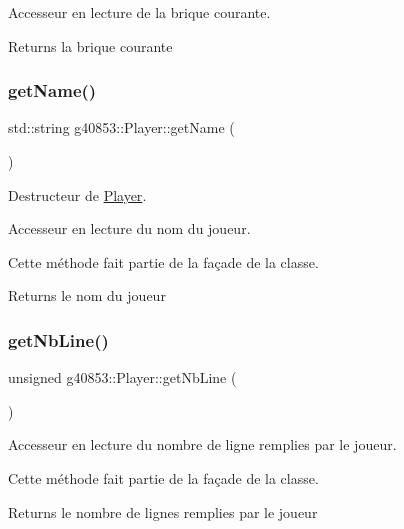 Accesseur en lecture de la brique courante. 

\begin{DoxyReturn}{Returns}
la brique courante 
\end{DoxyReturn}
\hypertarget{classg40853_1_1_player_a9dd73fb755774274ec182527c7401e84}{}\label{classg40853_1_1_player_a9dd73fb755774274ec182527c7401e84} 
\subsubsection{\texorpdfstring{get\+Name()}{getName()}}
{\footnotesize\ttfamily std\+::string g40853\+::\+Player\+::get\+Name (\begin{DoxyParamCaption}{ }\end{DoxyParamCaption})\hspace{0.3cm}{\ttfamily [inline]}}



Destructeur de \hyperlink{classg40853_1_1_player}{Player}. 

Accesseur en lecture du nom du joueur.

Cette méthode fait partie de la façade de la classe.

\begin{DoxyReturn}{Returns}
le nom du joueur 
\end{DoxyReturn}
\hypertarget{classg40853_1_1_player_a6dba0faa01aaa194c642de49e22b9f75}{}\label{classg40853_1_1_player_a6dba0faa01aaa194c642de49e22b9f75} 
\subsubsection{\texorpdfstring{get\+Nb\+Line()}{getNbLine()}}
{\footnotesize\ttfamily unsigned g40853\+::\+Player\+::get\+Nb\+Line (\begin{DoxyParamCaption}{ }\end{DoxyParamCaption})\hspace{0.3cm}{\ttfamily [inline]}}



Accesseur en lecture du nombre de ligne remplies par le joueur. 

Cette méthode fait partie de la façade de la classe.

\begin{DoxyReturn}{Returns}
le nombre de lignes remplies par le joueur 
\end{DoxyReturn}
\hypertarget{classg40853_1_1_player_a9f0a1c56d503a6eb8f20553d8cb3bfb0}{}\label{classg40853_1_1_player_a9f0a1c56d503a6eb8f20553d8cb3bfb0} 
